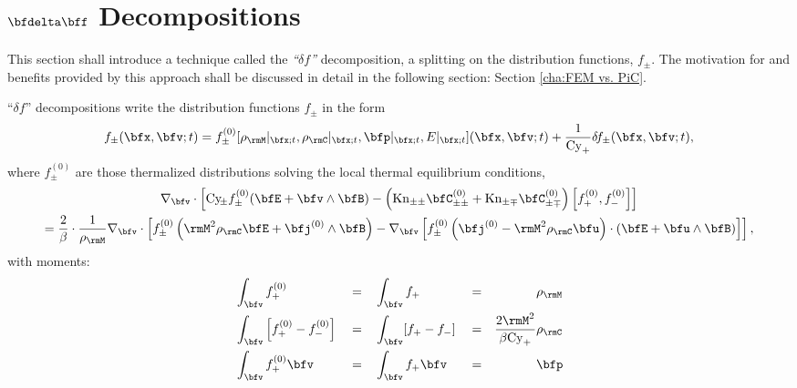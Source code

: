 \section{$\bfdelta\bff$ Decompositions}\label{cha:delta f decompositions}
    This section shall introduce a technique called the \emph{``$\delta\!f$''} decomposition, a splitting on the distribution functions, $f_{\pm}$. The motivation for and benefits provided by this approach shall be discussed in detail in the following section: Section \ref{cha:FEM vs. PiC}.

    \line

    \begin{definition}\label{def:delta f models}
        ``$\delta\!f$'' decompositions write the distribution functions $f_{\pm}$ in the form
        \begin{equation}
            f_{\pm}(\bfx, \bfv; t)  =  f_{\pm}^{(0)}[\rho_{\rmM}|_{\bfx; t}, \rho_{\rmC}|_{\bfx; t}, \bfp|_{\bfx; t}, E|_{\bfx; t}](\bfx, \bfv; t) + \frac{1}{\rmCy_{+}}\delta\!f_{\pm}(\bfx, \bfv; t),
        \end{equation}
        where $f_{\pm}^{(0)}$ are those thermalized distributions solving the local thermal equilibrium conditions,
        \begin{multline}\label{eqn:thermal equilibrium identity}
            \nabla_{\bfv}\cdot\left[\rmCy\!_{\pm}f_{\pm}^{(0)}(\bfE + \bfv\wedge\bfB) - \left(\rmKn_{\pm\pm}\bfC_{\pm\pm}^{(0)} + \rmKn_{\pm\mp}\bfC_{\pm\mp}^{(0)}\right)\left[f_{+}^{(0)}, f_{-}^{(0)}\right]\right]  \\
            =  \frac{2}{\beta}\cdot\frac{1}{\rho_{\rmM}}\nabla_{\bfv}\cdot\left[f_{\pm}^{(0)}\left(\rmM^{2}\rho_{\rmC}\bfE + \bfj^{(0)}\wedge\bfB\right) - \nabla_{\bfv}\left[f_{\pm}^{(0)}\left(\bfj^{(0)} - \rmM^{2}\rho_{\rmC}\bfu\right)\cdot\left(\bfE + \bfu\wedge\bfB\right)\right]\right],
        \end{multline}
        with moments:
        \begin{align}
            &\int_{\bfv}f_{+}^{(0)}                             &  &=  &  &\int_{\bfv}f_{+}                         &  &=  &  &\rho_{\rmM}  \\
            &\int_{\bfv}\left[f_{+}^{(0)} - f_{-}^{(0)}\right]  &  &=  &  &\int_{\bfv}[f_{+} - f_{-}]               &  &=  &  \frac{2\rmM^{2}}{\beta\rmCy_{+}}&\rho_{\rmC}  \\
            &\int_{\bfv}f_{+}^{(0)}\bfv                         &  &=  &  &\int_{\bfv}f_{+}\bfv                     &  &=  &  &\bfp  \\

\end{align}
\end{definition}
